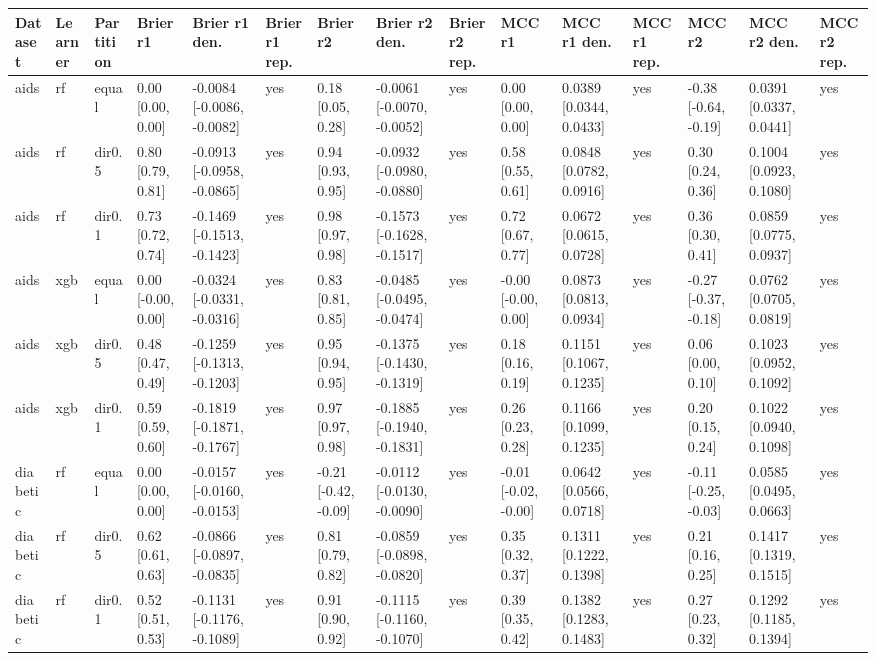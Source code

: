 \begin{tabular}{lllllllllllllll}
\toprule
Dataset & Learner & Partition & Brier r1 & Brier r1 den. & Brier r1 rep. & Brier r2 & Brier r2 den. & Brier r2 rep. & MCC r1 & MCC r1 den. & MCC r1 rep. & MCC r2 & MCC r2 den. & MCC r2 rep. \\
\midrule
aids & rf & equal & 0.00 [0.00, 0.00] & -0.0084 [-0.0086, -0.0082] & yes & 0.18 [0.05, 0.28] & -0.0061 [-0.0070, -0.0052] & yes & 0.00 [0.00, 0.00] & 0.0389 [0.0344, 0.0433] & yes & -0.38 [-0.64, -0.19] & 0.0391 [0.0337, 0.0441] & yes \\
aids & rf & dir0.5 & 0.80 [0.79, 0.81] & -0.0913 [-0.0958, -0.0865] & yes & 0.94 [0.93, 0.95] & -0.0932 [-0.0980, -0.0880] & yes & 0.58 [0.55, 0.61] & 0.0848 [0.0782, 0.0916] & yes & 0.30 [0.24, 0.36] & 0.1004 [0.0923, 0.1080] & yes \\
aids & rf & dir0.1 & 0.73 [0.72, 0.74] & -0.1469 [-0.1513, -0.1423] & yes & 0.98 [0.97, 0.98] & -0.1573 [-0.1628, -0.1517] & yes & 0.72 [0.67, 0.77] & 0.0672 [0.0615, 0.0728] & yes & 0.36 [0.30, 0.41] & 0.0859 [0.0775, 0.0937] & yes \\
aids & xgb & equal & 0.00 [-0.00, 0.00] & -0.0324 [-0.0331, -0.0316] & yes & 0.83 [0.81, 0.85] & -0.0485 [-0.0495, -0.0474] & yes & -0.00 [-0.00, 0.00] & 0.0873 [0.0813, 0.0934] & yes & -0.27 [-0.37, -0.18] & 0.0762 [0.0705, 0.0819] & yes \\
aids & xgb & dir0.5 & 0.48 [0.47, 0.49] & -0.1259 [-0.1313, -0.1203] & yes & 0.95 [0.94, 0.95] & -0.1375 [-0.1430, -0.1319] & yes & 0.18 [0.16, 0.19] & 0.1151 [0.1067, 0.1235] & yes & 0.06 [0.00, 0.10] & 0.1023 [0.0952, 0.1092] & yes \\
aids & xgb & dir0.1 & 0.59 [0.59, 0.60] & -0.1819 [-0.1871, -0.1767] & yes & 0.97 [0.97, 0.98] & -0.1885 [-0.1940, -0.1831] & yes & 0.26 [0.23, 0.28] & 0.1166 [0.1099, 0.1235] & yes & 0.20 [0.15, 0.24] & 0.1022 [0.0940, 0.1098] & yes \\
\addlinespace
diabetic & rf & equal & 0.00 [0.00, 0.00] & -0.0157 [-0.0160, -0.0153] & yes & -0.21 [-0.42, -0.09] & -0.0112 [-0.0130, -0.0090] & yes & -0.01 [-0.02, -0.00] & 0.0642 [0.0566, 0.0718] & yes & -0.11 [-0.25, -0.03] & 0.0585 [0.0495, 0.0663] & yes \\
diabetic & rf & dir0.5 & 0.62 [0.61, 0.63] & -0.0866 [-0.0897, -0.0835] & yes & 0.81 [0.79, 0.82] & -0.0859 [-0.0898, -0.0820] & yes & 0.35 [0.32, 0.37] & 0.1311 [0.1222, 0.1398] & yes & 0.21 [0.16, 0.25] & 0.1417 [0.1319, 0.1515] & yes \\
diabetic & rf & dir0.1 & 0.52 [0.51, 0.53] & -0.1131 [-0.1176, -0.1089] & yes & 0.91 [0.90, 0.92] & -0.1115 [-0.1160, -0.1070] & yes & 0.39 [0.35, 0.42] & 0.1382 [0.1283, 0.1483] & yes & 0.27 [0.23, 0.32] & 0.1292 [0.1185, 0.1394] & yes \\

\end{tabular}
